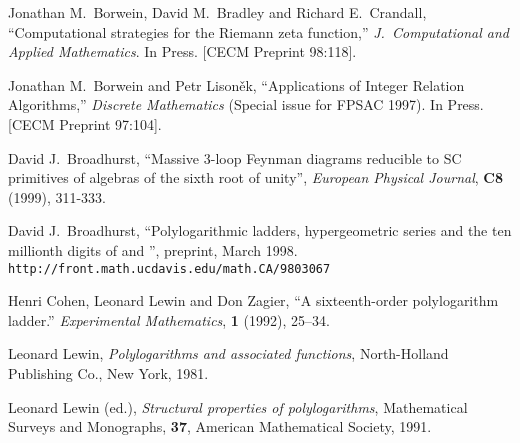 \documentclass[a4paper,a4paper]{article}
\begin{document}
\begin{thebibliography}{99}
Jonathan M.\ Borwein, David M.\ Bradley and Richard E.\ Crandall,
``Computational strategies for  the Riemann zeta function,''
{\it J.\ Computational and Applied Mathematics}. In Press.
[CECM Preprint 98:118].

Jonathan M.\ Borwein and Petr Lison\v ek,
``Applications of Integer Relation Algorithms,''
{\it Discrete Mathematics} (Special issue for FPSAC 1997).
In Press.
[CECM Preprint 97:104].

David J.\ Broadhurst,
``Massive 3-loop Feynman diagrams reducible to SC\myHighlight{$^*$}\coordHE{} primitives
of algebras of the sixth root of unity'',
{\it European Physical Journal}, {\bf C8} (1999), 311-333.

David J.\ Broadhurst,
``Polylogarithmic ladders, hypergeometric series and the ten millionth
digits of \coordHE{} and \coordHE{}'',
preprint, March 1998.
{\tt http://front.math.ucdavis.edu/math.CA/9803067}

Henri Cohen, Leonard Lewin and Don Zagier,
``A sixteenth-order polylogarithm ladder.''
{\it Experimental Mathematics}, {\bf 1} (1992), 25--34.

 Leonard Lewin,
{\it Polylogarithms and associated functions},
North-Holland Publishing Co., New York, 1981.

 Leonard Lewin (ed.),
{\it Structural properties of polylogarithms},
Mathematical Surveys and Monographs, {\bf 37},
American Mathematical Society, 1991.

\end{thebibliography}
\end{document}
